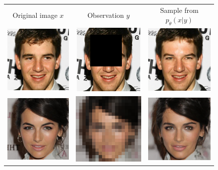 \begin{figure}[h]
    \begin{center}
    \begin{tabular}{ccc}
        \scriptsize Original image $x$ & \scriptsize  Observation $y$ &  \scriptsize  Sample from $p_\theta(x|y)$  \\

        \includegraphics[width=.13\textwidth]{Chapter2/samples/teaser/797_x.png} &   
        \includegraphics[width=.13\textwidth]{Chapter2/samples/teaser/797_y.png} &
        \includegraphics[width=.13\textwidth]{Chapter2/samples/teaser/797_1.png}  \\

        \includegraphics[width=.13\textwidth]{Chapter2/samples/teaser/x.png} &   
        \includegraphics[width=.13\textwidth]{Chapter2/samples/teaser/y.png} &
        \includegraphics[width=.13\textwidth]{Chapter2/samples/teaser/DV.png}  \\


\end{tabular}
\end{center}
\end{figure}
